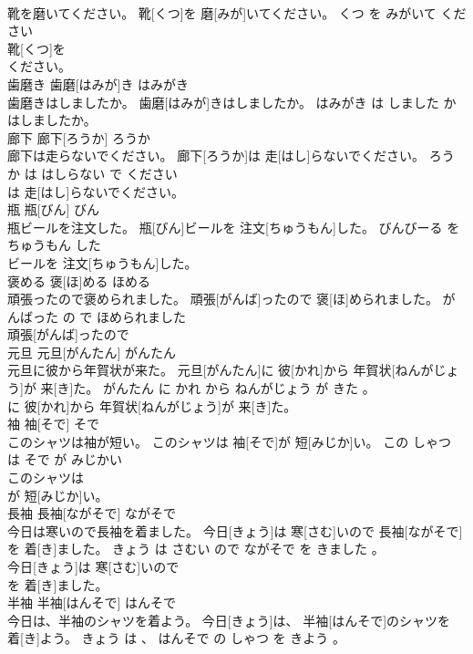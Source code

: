 \documentclass[8pt]{extreport}
\begin{document}
\begin{CJK}{UTF8}{min}
\\	靴を磨いてください。	靴[くつ]を 磨[みが]いてください。	くつ を みがいて ください	
\\	靴[くつ]を
\\	ください。		
\\	歯磨き	歯磨[はみが]き	はみがき	
\\	歯磨きはしましたか。	歯磨[はみが]きはしましたか。	はみがき は しました か	
\\	はしましたか。		
\\	廊下	廊下[ろうか]	ろうか	
\\	廊下は走らないでください。	廊下[ろうか]は 走[はし]らないでください。	ろうか は はしらない で ください	
\\	は 走[はし]らないでください。		
\\	瓶	瓶[びん]	びん	
\\	瓶ビールを注文した。	瓶[びん]ビールを 注文[ちゅうもん]した。	びんびーる を ちゅうもん した	
\\	ビールを 注文[ちゅうもん]した。		
\\	褒める	褒[ほ]める	ほめる	
\\	頑張ったので褒められました。	頑張[がんば]ったので 褒[ほ]められました。	がんばった の で ほめられました	
\\	頑張[がんば]ったので
\\	元旦	元旦[がんたん]	がんたん	
\\	元旦に彼から年賀状が来た。	元旦[がんたん]に 彼[かれ]から 年賀状[ねんがじょう]が 来[き]た。	がんたん に かれ から ねんがじょう が きた 。	
\\	に 彼[かれ]から 年賀状[ねんがじょう]が 来[き]た。		
\\	袖	袖[そで]	そで	
\\	このシャツは袖が短い。	このシャツは 袖[そで]が 短[みじか]い。	この しゃつ は そで が みじかい	
\\	このシャツは
\\	が 短[みじか]い。		
\\	長袖	長袖[ながそで]	ながそで	
\\	今日は寒いので長袖を着ました。	今日[きょう]は 寒[さむ]いので 長袖[ながそで]を 着[き]ました。	きょう は さむい ので ながそで を きました 。	
\\	今日[きょう]は 寒[さむ]いので
\\	を 着[き]ました。		
\\	半袖	半袖[はんそで]	はんそで	
\\	今日は、半袖のシャツを着よう。	今日[きょう]は、 半袖[はんそで]のシャツを 着[き]よう。	きょう は 、 はんそで の しゃつ を きよう 。	

\end{CJK}
\end{document}
